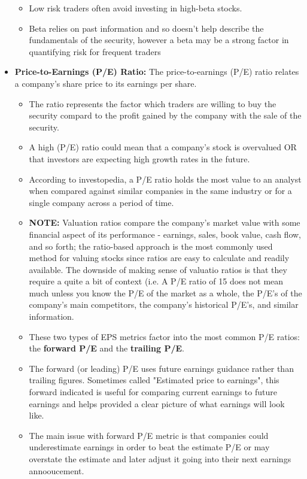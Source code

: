 \documentclass{article}
\begin{document}
\begin{itemize}
\begin{itemize}
				\item Low risk traders often avoid investing in high-beta stocks.
				\item Beta relies on past information and so doesn't help describe the fundamentals of the security, however a beta may be a strong factor in quantifying risk for frequent traders
			\end{itemize}
		\item {\bf Price-to-Earnings (P/E) Ratio:} The price-to-earnings (P/E) ratio relates a company's share price to its earnings per share.
			\begin{itemize}
				\item The ratio represents the factor which traders are willing to buy the security compard to the profit gained by the company with the sale of the security.
				\item A high (P/E) ratio could mean that a company's stock is overvalued OR that investors are expecting high growth rates in the future.
				\item According to investopedia, a P/E ratio holds the most value to an analyst when compared against similar companies in the same industry or for a single company across a period of time.
				\item {\bf NOTE:} Valuation ratios compare the company's market value with some financial aspect of its performance - earnings, sales, book value, cash flow, and so forth; the ratio-based approach is the most commonly used method for valuing stocks since ratios are easy to calculate and readily available. The downside of making sense of valuatio ratios is that they require a quite a bit of context (i.e. A P/E ratio of 15 does not mean much unless you know the P/E of the market as a whole, the P/E's of the company's main competitors, the company's historical P/E's, and similar information.
				\item These two types of EPS metrics factor into the most common P/E ratios: the {\bf forward P/E} and the {\bf trailing P/E}.
				\item The forward (or leading) P/E uses future earnings guidance rather than trailing figures. Sometimes called "Estimated price to earnings", this
					forward indicated is useful for comparing current earnings to future earnings and helps provided a clear picture of what earnings will look like.
				\item The main issue with forward P/E metric is that companies could underestimate earnings in order to beat the estimate P/E or may overstate the estimate and later adjust it going into their next earnings annooucement.

\end{itemize}
\end{itemize}
\end{document}
